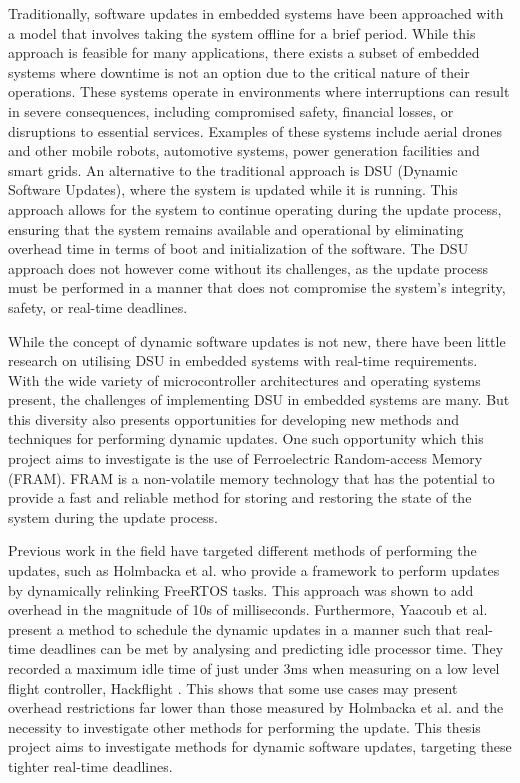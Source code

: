 Traditionally, software updates in embedded systems have been approached with a model that involves taking the system offline for a brief period. While this approach is feasible for many applications, there exists a subset of embedded systems where downtime is not an option due to the critical nature of their operations. These systems operate in environments where interruptions can result in severe consequences, including compromised safety, financial losses, or disruptions to essential services. Examples of these systems include aerial drones and other mobile robots, automotive systems, power generation facilities and smart grids. An alternative to the traditional approach is DSU (Dynamic Software Updates), where the system is updated while it is running. This approach allows for the system to continue operating during the update process, ensuring that the system remains available and operational by eliminating overhead time in terms of boot and initialization of the software. The DSU approach does not however come without its challenges, as the update process must be performed in a manner that does not compromise the system's integrity, safety, or real-time deadlines.

While the concept of dynamic software updates is not new, there have been little research on utilising DSU in embedded systems with real-time requirements. With the wide variety of microcontroller architectures and operating systems present, the challenges of implementing DSU in embedded systems are many. But this diversity also presents opportunities for developing new methods and techniques for performing dynamic updates. One such opportunity which this project aims to investigate is the use of Ferroelectric Random-access Memory (FRAM). FRAM is a non-volatile memory technology that has the potential to provide a fast and reliable method for storing and restoring the state of the system during the update process. 

Previous work in the field have targeted different methods of performing the updates, such as Holmbacka et al. \cite{dynUpdateFramework} who provide a framework to perform updates by dynamically relinking FreeRTOS tasks. This approach was shown to add overhead in the magnitude of 10s of milliseconds. Furthermore, Yaacoub et al. \cite{NeRTA} present a method to schedule the dynamic updates in a manner such that real-time deadlines can be met by analysing and predicting idle processor time. They recorded a maximum idle time of just under 3ms when measuring on a low level flight controller, Hackflight \cite{hackflight}. This shows that some use cases may present overhead restrictions far lower than those measured by Holmbacka et al. and the necessity to investigate other methods for performing the update. This thesis project aims to investigate methods for dynamic software updates, targeting these tighter real-time deadlines.  